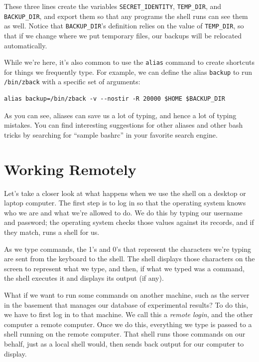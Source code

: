\documentclass[]{book}
\newcommand{\gdef}[2]{\emph{#2}}
\begin{document}
These three lines create the variables \texttt{SECRET\_IDENTITY},
\texttt{TEMP\_DIR}, and \texttt{BACKUP\_DIR}, and export them so that
any programs the shell runs can see them as well. Notice that
\texttt{BACKUP\_DIR}'s definition relies on the value of
\texttt{TEMP\_DIR}, so that if we change where we put temporary files,
our backups will be relocated automatically.

While we're here, it's also common to use the \texttt{alias} command to
create shortcuts for things we frequently type. For example, we can
define the alias \texttt{backup} to run \texttt{/bin/zback} with a
specific set of arguments:

\begin{verbatim}
alias backup=/bin/zback -v --nostir -R 20000 $HOME $BACKUP_DIR
\end{verbatim}

As you can see, aliases can save us a lot of typing, and hence a lot of
typing mistakes. You can find interesting suggestions for other aliases
and other bash tricks by searching for ``sample bashrc'' in your
favorite search engine.

\section{Working Remotely}

Let's take a closer look at what happens when we use the shell on a
desktop or laptop computer. The first step is to log in so that the
operating system knows who we are and what we're allowed to do. We do
this by typing our username and password; the operating system checks
those values against its records, and if they match, runs a shell for
us.

As we type commands, the 1's and 0's that represent the characters we're
typing are sent from the keyboard to the shell. The shell displays those
characters on the screen to represent what we type, and then, if what we
typed was a command, the shell executes it and displays its output (if
any).

What if we want to run some commands on another machine, such as the
server in the basement that manages our database of experimental
results? To do this, we have to first log in to that machine. We call
this a \gdef{g:remote-login}{remote login}, and the other computer a
remote computer. Once we do this, everything we type is passed to a
shell running on the remote computer. That shell runs those commands on
our behalf, just as a local shell would, then sends back output for our
computer to display.
\end{document}
